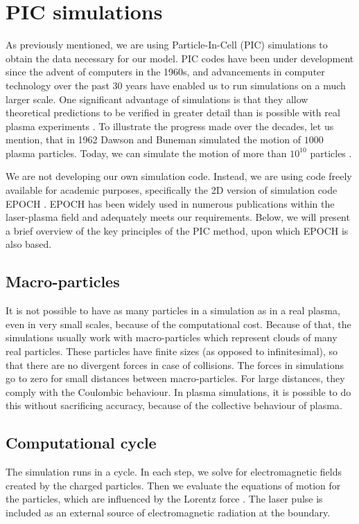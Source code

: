 \section{PIC simulations}
As previously mentioned, we are using Particle-In-Cell (PIC) simulations to obtain the data necessary for our model. PIC codes have been under development since the advent of computers in the 1960s, and advancements in computer technology over the past 30 years have enabled us to run simulations on a much larger scale. One significant advantage of simulations is that they allow theoretical predictions to be verified in greater detail than is possible with real plasma experiments \cite{dawson1962}. To illustrate the progress made over the decades, let us mention, that in 1962 Dawson and Buneman simulated the motion of $1000$ plasma particles. Today, we can simulate the motion of more than $10^{10}$ particles \cite{tskhakaya2007}.

We are not developing our own simulation code. Instead, we are using code freely available for academic purposes, specifically the 2D version of simulation code EPOCH \cite{arber2015}. EPOCH has been widely used in numerous publications within the laser-plasma field and adequately meets our requirements. Below, we will present a brief overview of the key principles of the PIC method, upon which EPOCH is also based.

\subsection*{Macro-particles}
It is not possible to have as many particles in a simulation as in a real plasma, even in very small scales, because of the computational cost. Because of that, the simulations usually work with macro-particles which represent clouds of many real particles. These particles have finite sizes (as opposed to infinitesimal), so that there are no divergent forces in case of collisions. The forces in simulations go to zero for small distances between macro-particles. For large distances, they comply with the Coulombic behaviour. In plasma simulations, it is possible to do this without sacrificing accuracy, because of the collective behaviour of plasma\cite{fonseca2009}.

\subsection*{Computational cycle}
The simulation runs in a cycle. In each step, we solve for electromagnetic fields created by the charged particles. Then we evaluate the equations of motion for the particles, which are influenced by the Lorentz force \cite{birdsall1985}. The laser pulse is included as an external source of electromagnetic radiation at the boundary.


